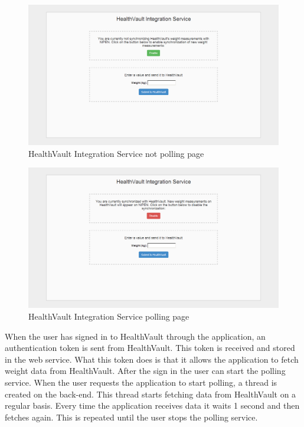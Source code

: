 \begin{figure}[H]
\centering
\includegraphics[scale=0.4]{../Figures/webservice-not-polling.png}
\caption{HealthVault Integration Service not polling page}
\label{figure:webservice-not-polling}
\end{figure}

\begin{figure}[H]
\centering
\includegraphics[scale=0.4]{../Figures/webservice-polling.png}
\caption{HealthVault Integration Service polling page}
\label{figure:webservice-polling}
\end{figure}

When the user has signed in to HealthVault through the application, an authentication token is sent from HealthVault.
This token is received and stored in the web service.
What this token does is that it allows the application to fetch weight data from HealthVault.
After the sign in the user can start the polling service.
When the user requests the application to start polling, a thread is created on the back-end.
This thread starts fetching data from HealthVault on a regular basis.
Every time the application receives data it waits 1 second and then fetches again.
This is repeated until the user stops the polling service.


